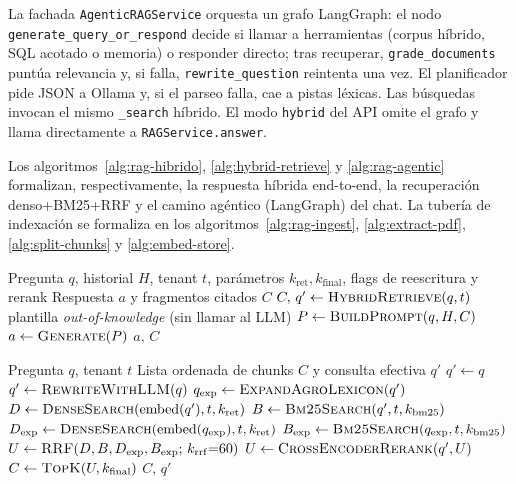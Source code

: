 La fachada \texttt{AgenticRAGService} orquesta un grafo LangGraph: el nodo \texttt{generate\_query\_or\_respond} decide si llamar a herramientas (corpus híbrido, SQL acotado o memoria) o responder directo; tras recuperar, \texttt{grade\_documents} puntúa relevancia y, si falla, \texttt{rewrite\_question} reintenta una vez. El planificador pide JSON a Ollama y, si el parseo falla, cae a pistas léxicas. Las búsquedas invocan el mismo \texttt{\_search} híbrido. El modo \texttt{hybrid} del API omite el grafo y llama directamente a \texttt{RAGService.answer}.

Los algoritmos~\ref{alg:rag-hibrido}, \ref{alg:hybrid-retrieve} y \ref{alg:rag-agentic} formalizan, respectivamente, la respuesta híbrida end-to-end, la recuperación denso+BM25+RRF y el camino agéntico (LangGraph) del chat. La tubería de indexación se formaliza en los algoritmos~\ref{alg:rag-ingest}, \ref{alg:extract-pdf}, \ref{alg:split-chunks} y \ref{alg:embed-store}.

\begin{algorithm}[htbp]
\caption{Respuesta RAG híbrida (modo \texttt{hybrid})}
\label{alg:rag-hibrido}
\begin{algorithmic}[1]
\Require Pregunta $q$, historial $H$, tenant $t$, parámetros $k_{\mathrm{ret}}, k_{\mathrm{final}}$, flags de reescritura y rerank
\Ensure Respuesta $a$ y fragmentos citados $C$
\State $C,\,q' \gets \textsc{HybridRetrieve}(q,t)$ 
  \State \Return plantilla \emph{out-of-knowledge} (sin llamar al LLM)
\EndIf
\State $P \gets \textsc{BuildPrompt}(q, H, C)$ 
\State $a \gets \textsc{Generate}(P)$ 
\State \Return $a,\,C$
\end{algorithmic}
\end{algorithm}

\begin{algorithm}[htbp]
\caption{Recuperación híbrida dens+BM25+RRF}
\label{alg:hybrid-retrieve}
\begin{algorithmic}[1]
\Require Pregunta $q$, tenant $t$
\Ensure Lista ordenada de chunks $C$ y consulta efectiva $q'$
\State $q' \gets q$
  \State $q' \gets \textsc{RewriteWithLLM}(q)$ 
\EndIf
\State $q_{\mathrm{exp}} \gets \textsc{ExpandAgroLexicon}(q')$ 
\State $D \gets \textsc{DenseSearch}(\mathrm{embed}(q'), t, k_{\mathrm{ret}})$ 
\State $B \gets \textsc{Bm25Search}(q', t, k_{\mathrm{bm25}})$
\State $D_{\mathrm{exp}} \gets \textsc{DenseSearch}(\mathrm{embed}(q_{\mathrm{exp}}), t, k_{\mathrm{ret}})$
\State $B_{\mathrm{exp}} \gets \textsc{Bm25Search}(q_{\mathrm{exp}}, t, k_{\mathrm{bm25}})$
\State $U \gets \textsc{RRF}(D, B, D_{\mathrm{exp}}, B_{\mathrm{exp}};\, k_{\mathrm{rrf}}{=}60)$
  \State $U \gets \textsc{CrossEncoderRerank}(q', U)$
\EndIf
\State $C \gets \textsc{TopK}(U, k_{\mathrm{final}})$
\State \Return $C,\,q'$
\end{algorithmic}
\end{algorithm}

